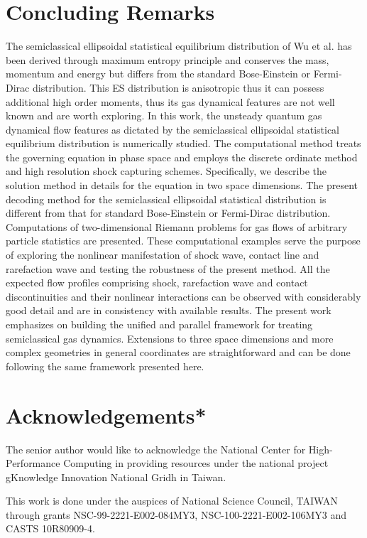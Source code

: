 \documentclass{rsproca}%
\begin{document}
\section{Concluding Remarks}
\label{remarks}
The semiclassical ellipsoidal statistical equilibrium distribution of Wu et al. \cite{Wu2012} has been derived through maximum entropy principle and conserves the mass, momentum and energy but differs from the standard Bose-Einstein or Fermi-Dirac distribution.  This ES distribution is anisotropic thus it can possess additional high order moments, thus its gas dynamical features are not well known and are worth exploring.   In this work, the unsteady quantum gas dynamical flow features as dictated by the semiclassical ellipsoidal statistical equilibrium distribution is numerically studied.   The computational method treats the governing equation in phase space and employs the discrete ordinate method and high resolution shock capturing schemes.  Specifically, we describe the solution method in details for the equation in two space dimensions.   The present decoding method for the semiclassical ellipsoidal statistical distribution is different from that for standard Bose-Einstein or Fermi-Dirac distribution.   Computations of two-dimensional Riemann problems for gas flows of arbitrary particle statistics are presented.  These computational examples serve the purpose of exploring the nonlinear manifestation of shock wave, contact line and rarefaction wave and testing the robustness of the present method.   All the expected flow profiles comprising shock, rarefaction wave and contact discontinuities and their nonlinear interactions can be observed with considerably good detail and are in consistency with available results.   The present work emphasizes on building the unified and parallel framework for treating semiclassical gas dynamics.   Extensions to three space dimensions and more complex geometries in general coordinates are straightforward and can be done following the same framework presented here.


\section{Acknowledgements*}
\label{Acknowledgements}
The senior author would like to acknowledge the National Center for High-Performance Computing in providing resources
under the national project gKnowledge Innovation National Gridh in Taiwan.

This work is done under the auspices of National Science Council, TAIWAN through grants NSC-99-2221-E002-084MY3, NSC-100-2221-E002-106MY3 and CASTS 10R80909-4.






\end{document}
